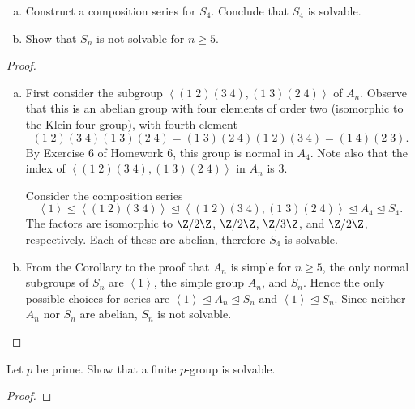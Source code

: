 \documentclass[10pt]{amsart}
\begin{document}
\begin{thm}
  \begin{enumerate}[(a)]
  \item
    Construct a composition series for $S_4$.
    Conclude that $S_4$ is solvable.
  \item
    Show that $S_n$ is not solvable for $n \geq 5$.
  \end{enumerate}
  \begin{proof}
    \begin{enumerate}[(a)]
    \item
      First consider the subgroup $\left<\left(1 \; 2\right)\left( 3 \; 4\right),  \left(1 \; 3\right)\left( 2 \; 4\right)\right>$ of $A_n$.
      Observe that this is an abelian group with four elements of order two (isomorphic to the Klein four-group), with fourth element $$\left(1 \; 2\right)\left( 3 \; 4\right)\left(1 \; 3\right)\left( 2 \; 4\right) = \left(1 \; 3\right)\left( 2 \; 4\right)\left(1 \; 2\right)\left( 3 \; 4\right) = \left(1 \; 4\right)\left( 2 \; 3\right).$$
      By Exercise 6 of Homework 6, this group is normal in $A_4$.
      Note also that the index of $\left<\left(1 \; 2\right)\left( 3 \; 4\right),  \left(1 \; 3\right)\left( 2 \; 4\right)\right>$ in $A_n$ is 3.
      
      Consider the composition series 
      $$\left<1\right> \unlhd \left<\left(1 \; 2\right)\left( 3 \; 4\right)\right> \unlhd \left<\left(1 \; 2\right)\left( 3 \; 4\right),  \left(1 \; 3\right)\left( 2 \; 4\right)\right> \unlhd A_4 \unlhd S_4.$$
      The factors are isomorphic to $\Z/2\Z$, $\Z/2\Z$, $\Z/3\Z$, and $\Z/2\Z$, respectively.
      Each of these are abelian, therefore $S_4$ is solvable.
    \item
      From the Corollary to the proof that $A_n$ is simple for $n \geq 5$, the only normal subgroups of $S_n$ are $\left< 1 \right>$, the simple group $A_n$, and $S_n$.
      Hence the only possible choices for series are $\left< 1 \right> \unlhd A_n \unlhd S_n$ and $\left< 1 \right> \unlhd S_n$.
      Since neither $A_n$ nor $S_n$ are abelian, $S_n$ is not solvable. 
    \end{enumerate}
  \end{proof}
\end{thm}

\begin{thm}
  Let $p$ be prime.
  Show that a finite $p$-group is solvable.
  \begin{proof}
  \end{proof}
\end{thm}
\end{document}
